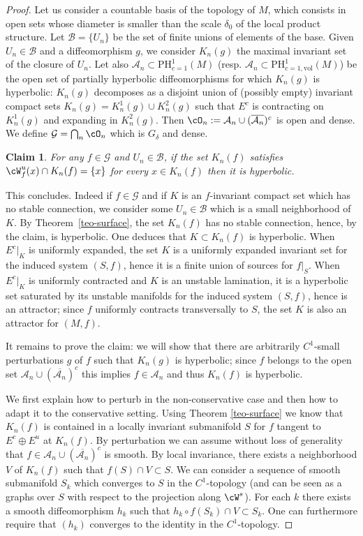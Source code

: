 \documentclass[a4paper,11pt]{amsart}
\numberwithin{equation}{section}     %
\def\cA{\mathcal{A}}  \def\cG{\mathcal{G}} \def\cM{\mathcal{M}} \def\cS{\mathcal{S}}
\def\cB{\mathcal{B}}  \def\cH{\mathcal{H}} \def\cN{\mathcal{N}} \def\cT{\mathcal{T}}
\newtheorem*{af}{Claim}
\theoremstyle{definition}
\theoremstyle{remark}
\begin{document}
\begin{proof}
Let us consider a countable basis of the topology of $M$, which consists in open sets
whose diameter is smaller than the scale  $\delta_0$ of the local product structure.
Let $\cB= \{U_n\}$ be the set of finite unions of elements of the base. Given $U_n \in \cB$
and a diffeomorphism $g$, we consider $K_n(g)$ the maximal invariant set of the closure of $U_n$. Let also $\cA_n \subset \mathrm{PH}^1_{c=1}(M)$ (resp. $\cA_n \subset \mathrm{PH}^1_{c=1,\mathrm{vol}}(M)$) be the open set of partially hyperbolic diffeomorphisms for which $K_n(g)$ is hyperbolic: $K_n(g)$ decomposes as a disjoint union of (possibly empty) invariant compact sets $K_n(g)=K_n^1(g) \cup K_n^2(g)$ such that $E^c$ is contracting on $K_n^1(g)$ and expanding in $K_n^2(g)$. Then $\cO_n := \cA_n \cup (\overline{\cA_n})^c$ is open and dense. We define $\cG = \bigcap_n \cO_n$ which is $G_\delta$ and dense.

\begin{af}
For any $f \in \cG$ and $U_n \in \cB$, if the set $K_n(f)$ satisfies $\cW^u_f(x) \cap K_n(f) = \{x\}$ for every $x \in K_n(f)$ then it is hyperbolic.
\end{af}

This concludes. Indeed if $f \in \cG$ and if $K$ is an $f$-invariant compact set which has no stable connection, we consider some $U_n\in \cB$ which is a small neighborhood of $K$.
By Theorem~\ref{teo-surface}, the set $K_n(f)$ has no stable connection, hence, by the claim, is hyperbolic. One deduces that $K\subset K_n(f)$ is hyperbolic.
When $E^c|_K$ is uniformly expanded,
the set $K$ is a uniformly expanded invariant set for the induced system $(S,f)$,
hence it is a finite union of sources for $f|_S$.
When $E^c|_K$ is uniformly contracted and $K$ is an unstable lamination,
it is a hyperbolic set saturated by its unstable manifolds for the induced system $(S,f)$,
hence is an attractor; since $f$ uniformly contracts transversally to $S$, the set $K$
is also an attractor for $(M,f)$.

\smallskip

It remains to prove the claim: we will show that there are arbitrarily $C^1$-small perturbations $g$ of $f$ such that $K_n(g)$ is hyperbolic; since $f$ belongs to the open set  $\cA_n \cup (\overline{\cA_n})^c$ this implies $f \in \cA_n$ and thus $K_n(f)$ is hyperbolic.

We first explain how to perturb in the non-conservative case and then how to adapt it to the conservative setting. Using Theorem \ref{teo-surface} we know that $K_n(f)$ is contained in a locally invariant submanifold $S$ for $f$ tangent to $E^c \oplus E^u$ at $K_n(f)$. By perturbation we can assume without loss of generality that $f\in \cA_n \cup (\overline{\cA_n})^c$ is smooth. By local invariance, there exists a neighborhood $V$ of $K_n(f)$ such that $f(S)\cap V\subset S$.
We can consider a sequence of smooth submanifold $S_k$ which converges to $S$ in the $C^1$-topology (and can be seen as a graphs over $S$ with respect to the projection along $\cW^s$). For each $k$ there exists a smooth diffeomorphism $h_k$ such that $h_k\circ f(S_k)\cap V\subset S_k$. One can furthermore require that $(h_k)$ converges to the identity in the $C^1$-topology.


\end{proof}
\end{document}
